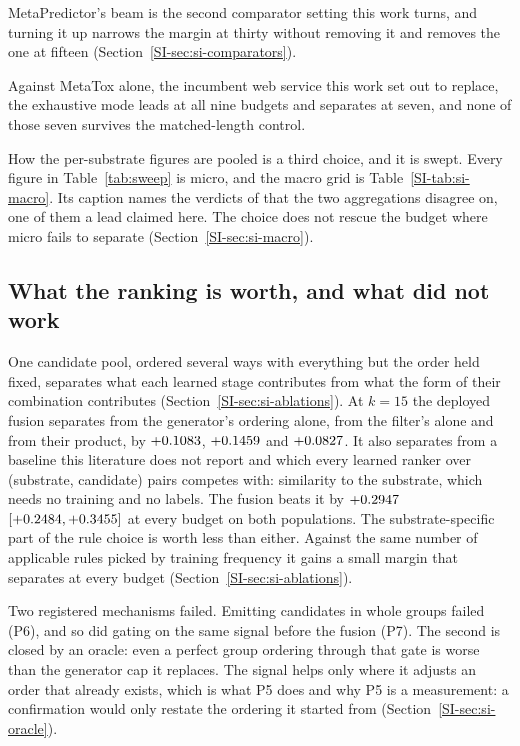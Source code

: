 MetaPredictor's beam is the second comparator setting this work turns, and turning it up narrows the margin at thirty without removing it and removes the one at fifteen (Section~\ref{SI-sec:si-comparators}).

Against MetaTox alone, the incumbent web service this work set out to replace, the exhaustive mode
leads at all nine budgets and separates at seven, and none of those seven survives the
matched-length control.

How the per-substrate figures are pooled is a third choice, and it is swept.
Every figure in Table~\ref{tab:sweep} is micro,
and the macro grid is Table~\ref{SI-tab:si-macro}. Its caption names the
\numAggregationMovedWord{} verdicts of \numAggregationContrasts{} that the two aggregations
disagree on, one of them a lead claimed here. The choice does not rescue the budget where micro fails to separate (Section~\ref{SI-sec:si-macro}).

\subsection{What the ranking is worth, and what did not work}

One candidate pool, ordered several ways with everything but the order held fixed, separates what each learned stage contributes from what the form of their combination contributes (Section~\ref{SI-sec:si-ablations}). At $k=15$ the deployed fusion separates from
the generator's ordering alone, from the filter's alone and from their product, by
$+0.1083$, $+0.1459$ and $+0.0827$. It also separates from a baseline this literature does not report and which every learned ranker
over (substrate, candidate) pairs competes with: similarity to the
substrate, which needs no training and no labels. The fusion beats it by $+0.2947$
$[+0.2484, +0.3455]$ at every budget on both populations. The substrate-specific part of the rule choice is worth less than either. Against the same number of applicable rules picked by training frequency it gains a small margin that separates at every budget (Section~\ref{SI-sec:si-ablations}).

Two registered mechanisms failed. Emitting candidates in whole groups failed (P6), and so did gating on the same signal before the fusion (P7). The second is closed by an oracle: even
a perfect group ordering through that gate is worse than the generator cap it replaces. The signal
helps only where it adjusts an order that already exists, which is what P5 does and why P5 is a
measurement: a confirmation would only restate the ordering it started from (Section~\ref{SI-sec:si-oracle}).


